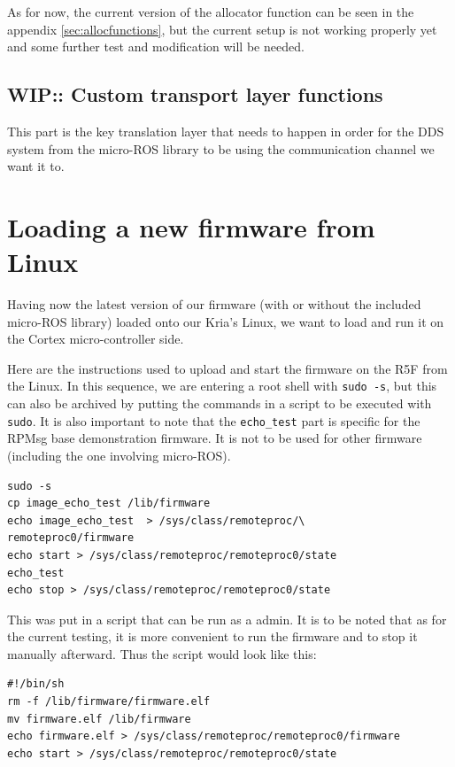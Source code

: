 \documentclass[10pt]{article}
\begin{document}
As for now, the current version of the allocator function can be seen in the
appendix \ref{sec:allocfunctions}, but the current setup is not working
properly yet and some further test and modification will be needed.

\subsection{WIP:: Custom transport layer functions}
This part is the key translation layer that needs to happen in order for the
DDS system from the micro-ROS library to be using the communication channel we
want it to.





\section{Loading a new firmware from Linux}
Having now the latest version of our firmware (with or without the included
micro-ROS library) loaded onto our Kria's Linux, we want to load and run it
on the Cortex micro-controller side.

Here are the instructions used to upload and start the firmware
on the R5F from the Linux.
In this sequence, we are entering a root shell with \verb|sudo -s|, but this can
also be archived by putting the commands in a script to be executed with \verb|sudo|.
It is also important to note that the \verb|echo_test| part is specific for the
RPMsg base demonstration firmware. It is not to be used for other firmware
(including the one involving micro-ROS).
\begin{tcolorbox}
\begin{verbatim}
sudo -s
cp image_echo_test /lib/firmware
echo image_echo_test  > /sys/class/remoteproc/\
remoteproc0/firmware
echo start > /sys/class/remoteproc/remoteproc0/state
echo_test
echo stop > /sys/class/remoteproc/remoteproc0/state
\end{verbatim}
\end{tcolorbox}

This was put in a script that can be run as a admin.
It is to be noted that as for the current testing, it is more convenient
to run the firmware and to stop it manually afterward.
Thus the script would look like this:
\begin{tcolorbox}
\begin{verbatim}
#!/bin/sh
rm -f /lib/firmware/firmware.elf
mv firmware.elf /lib/firmware
echo firmware.elf > /sys/class/remoteproc/remoteproc0/firmware
echo start > /sys/class/remoteproc/remoteproc0/state
\end{verbatim}
\end{tcolorbox}
\end{document}
